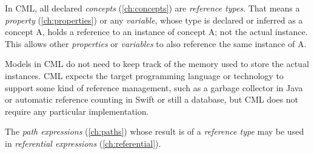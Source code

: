 In CML, all declared \emph{concepts} (\ref{ch:concepts}) are \emph{reference types}.
That means a \emph{property} (\ref{ch:properties}) or any \emph{variable},
whose type is declared or inferred as a concept A, holds a reference
to an instance of concept A; not the actual instance.
This allows other \emph{properties} or \emph{variables}
to also reference the same instance of A.

Models in CML do not need to keep track of the memory used
to store the actual instances.
CML expects the target programming language or technology
to support some kind of reference management,
such as a garbage collector in Java or automatic reference counting in Swift
or still a database,
but CML does not require any particular implementation.

The \emph{path expressions} (\ref{ch:paths})
whose result is of a \emph{reference type} may be used
in \emph{referential expressions} (\ref{ch:referential}).
